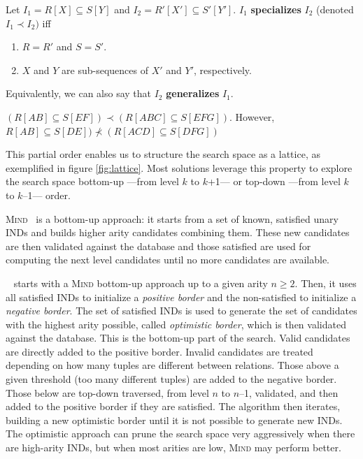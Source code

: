 \begin{definition}
    \label{def:specialization}
    Let $I_1 = R[X] \subseteq S[Y]$ and
    $I_2 = R'[X'] \subseteq S'[Y']$. $I_1$ \textbf{specializes} $I_2$ (denoted $I_1 \prec I_2)$ iff
    
    \begin{enumerate}
        \item $R = R'$ and $S = S'$.
        \item $X$ and $Y$ are sub-sequences of $X'$ and $Y'$, respectively.
    \end{enumerate}
    
    Equivalently, we can also say that $I_2$ \textbf{generalizes} $I_1$.
\end{definition}

\begin{example}
$(R[AB] \subseteq S[EF]) \prec (R[ABC] \subseteq S[EFG])$. However,
$R[AB] \subseteq S[DE]) \nprec (R[ACD] \subseteq S[DFG])$
\end{example}

This partial order enables us to structure the search space as a lattice, as exemplified in figure
\ref{fig:lattice}. Most solutions leverage this property to explore the search space bottom-up
---from level $k$ to $k$+1--- or top-down ---from level $k$ to $k$--1--- order.

\textsc{Mind}~\cite{DeMarchi2002} is a bottom-up approach: it starts
from a set of known, satisfied unary INDs and builds higher arity candidates
combining them.
These new candidates are then validated against the database and those satisfied
are used for computing the next level candidates until no more candidates are available.

\Zigzag~\cite{DeMarchi2003zigzag} starts with a \textsc{Mind} bottom-up approach
up to a given arity $n \ge 2$. Then, it uses all satisfied INDs to initialize a \textit{positive border}
and the non-satisfied to initialize a \textit{negative border}. The set of satisfied INDs
is used to generate the set of candidates with the highest arity possible, called
\textit{optimistic border},
which is then validated against the database. This is the bottom-up part of the search.
Valid candidates are directly added to the positive border.
Invalid candidates are treated depending on how many tuples are different between relations.
Those above a given threshold (too many different tuples) are added to the negative border.
Those below are top-down traversed, from level $n$ to $n$--1, validated, and then added
to the positive border if they are satisfied. The algorithm then iterates, building a new
optimistic border until it is not possible to generate new INDs. The optimistic approach
can prune the search space very aggressively when there are high-arity INDs,
but when most arities are low,  \textsc{Mind} may perform better.

